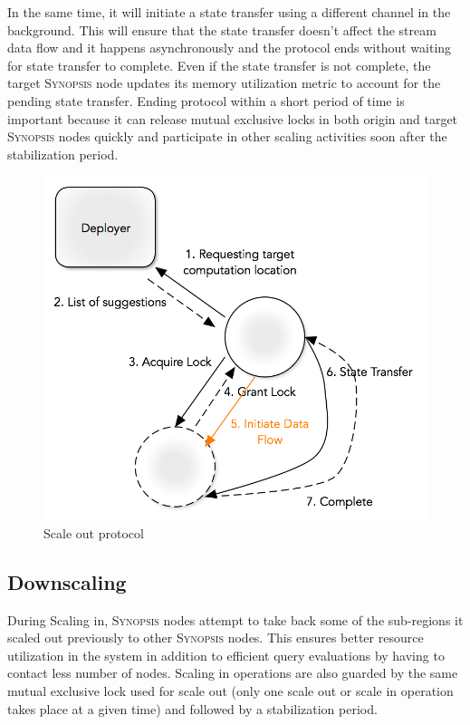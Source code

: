 In the same time, it will initiate a state transfer using a different channel in the background.
This will ensure that the state transfer doesn't affect the stream data flow and it happens asynchronously and the protocol ends without waiting for state transfer to complete.
Even if the state transfer is not complete, the target \textsc{Synopsis} node updates its memory utilization metric to account for the pending state transfer. 
Ending protocol within a short period of time is important because it can release mutual exclusive locks in both origin and target \textsc{Synopsis} nodes quickly and participate in other scaling activities soon after the stabilization period.
%
\begin{figure}
    \centerline{\includegraphics[scale=0.55]{figures/scale-out-protocol.png}}
    \caption{Scale out protocol}
    \label{fig:scale-out-protocol}
\end{figure}
%
\subsection{Downscaling}
\label{subsec:scaling-in}
During Scaling in, \textsc{Synopsis} nodes attempt to take back some of the sub-regions it scaled out previously to other \textsc{Synopsis} nodes.
This ensures better resource utilization in the system in addition to efficient query evaluations by having to contact less number of nodes.
Scaling in operations are also guarded by the same mutual exclusive lock used for scale out (only one scale out or scale in operation takes place at a given time) and followed by a stabilization period.

